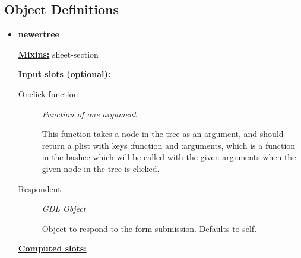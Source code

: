 \documentclass [11pt]{book}
\begin{document}
\label{sec:tree(treecomponentusedbytastyandpotentiallyasauicomponentonitsown)}





\subsection{Object Definitions}

\label{subsec:objectdefinitions}



\begin{itemize}

\item {}
\label{prim:newertree}
\textbf{newertree}


\textbf{
\underline{Mixins:}} sheet-section





\begin{description}

\end{description}








\textbf{
\underline{Input slots (optional):}}

\begin{description}

\item [Onclick-function]
\emph{Function of one argument}

 This function takes a node in the tree as an argument, and should return
a plist with keys :function and :arguments, which is a function in the bashee which will be called
with the given arguments when the given node in the tree is clicked.




\item [Respondent]
\emph{GDL Object}

 Object to respond to the form submission. Defaults to self.




\end{description}






\textbf{
\underline{Computed slots:}}

\begin{description}


\end{description}
\end{itemize}
\end{document}
